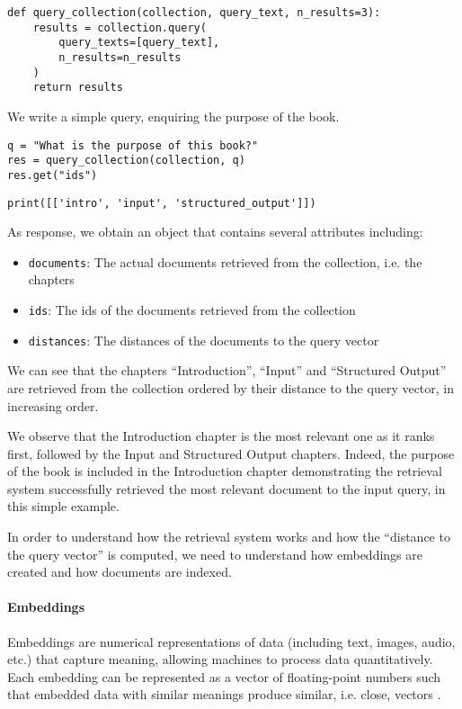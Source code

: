 \begin{verbatim}
def query_collection(collection, query_text, n_results=3):
    results = collection.query(
        query_texts=[query_text],
        n_results=n_results
    )
    return results
\end{verbatim}
We write a simple query, enquiring the purpose of the book.

\begin{verbatim}
q = "What is the purpose of this book?"
res = query_collection(collection, q)
res.get("ids")
\end{verbatim}

\begin{verbatim}
print([['intro', 'input', 'structured_output']])
\end{verbatim}

As response, we obtain an object that contains several attributes including:
\begin{itemize}
    \item \texttt{documents}: The actual documents retrieved from the collection, i.e. the chapters 
    \item \texttt{ids}: The ids of the documents retrieved from the collection
    \item \texttt{distances}: The distances of the documents to the query vector
\end{itemize}

We can see that the chapters ``Introduction'', ``Input'' and ``Structured Output'' are retrieved from the collection ordered by their distance to the query vector, in increasing order.

We observe that the Introduction chapter is the most relevant one as it ranks first, followed by the Input and Structured Output chapters. Indeed, the purpose of the book is included in the Introduction chapter demonstrating the retrieval system successfully retrieved the most relevant document to the input query, in this simple example.

In order to understand how the retrieval system works and how the ``distance to the query vector'' is computed, we need to understand how embeddings are created and how documents are indexed.
\paragraph{Embeddings}

Embeddings are numerical representations of data (including text, images, audio, etc.) that capture meaning, allowing machines to process data quantitatively. Each embedding can be represented as a vector of floating-point numbers such that embedded data with similar meanings produce similar, i.e. close, vectors .

